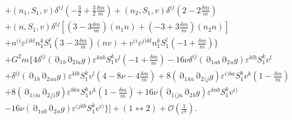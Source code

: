 {\begin{align}
& + (n_1,S_1,v) \delta^{ij}\left(-\frac{3}{2} +\frac{3}{2}\frac{\delta m}{m}\right) 
+ (n_2,S_1,v) \delta^{ij}\left(2 -2\frac{\delta m}{m}\right) \nonumber \\ 
&+ (n,S_1,v) \delta^{ij}\left[\left(3 -3\frac{\delta m}{m}\right) (n_1n)+\left(-3 +3\frac{\delta m}{m}\right) (n_2n)\right] \nonumber \\ 
&+ n^{(i} \varepsilon^{j)kl} n_1^{k} S_1^{l}\left(3 -3\frac{\delta m}{m}\right) (nv) 
+ v^{(i} \varepsilon^{j)kl} n_1^{k} S_1^{l}\left(-1 +\frac{\delta m}{m}\right)
\bigg\}\nonumber \\ 
&+G^{2}m\bigg\{
4 \delta^{ij} (\mathop{\partial}_{1}{}_{b}\mathop{\partial}_{2}{}_{la}g) \varepsilon^{kab} S_1^{k} v^{l} \left(-1 + \frac{\delta m}{m}\right)
-16 \nu \delta^{ij} (\mathop{\partial}_{1}{}_{ab}\mathop{\partial}_{2}{}_{a}g) \varepsilon^{klb} S_1^{k} v^{l}\nonumber \\ 
&+ \delta^{ij} (\mathop{\partial}_{1}{}_{b}\mathop{\partial}_{2}{}_{aa}g) \varepsilon^{klb} S_1^{k} v^{l} \left(4 - 8\nu - 4 \frac{\delta m}{m}\right)
+ 8 (\mathop{\partial}_{1}{}_{ka}\mathop{\partial}_{2}{}_{(j}g) \varepsilon^{i)ba} S_1^{b} v^{k} \left(1 - \frac{\delta m}{m}\right)\nonumber \\ 
&+ 8 (\mathop{\partial}_{1}{}_{(ia}\mathop{\partial}_{2}{}_{j)}g) \varepsilon^{bka} S_1^{b} v^{k} \left(1 - \frac{\delta m}{m}\right)
+ 16 \nu (\mathop{\partial}_{1}{}_{(ja}\mathop{\partial}_{2}{}_{b}g) \varepsilon^{kab} S_1^{k} v^{i)} \nonumber \\ 
&- 16 \nu (\mathop{\partial}_{1}{}_{ab}\mathop{\partial}_{2}{}_{a}g) \varepsilon^{(jkb} S_1^{k} v^{i)} 
\bigg\}
\Bigg]+ (1\leftrightarrow 2) + \mathcal{O}\left(\frac{1}{c^8}\right).
\end{align}}